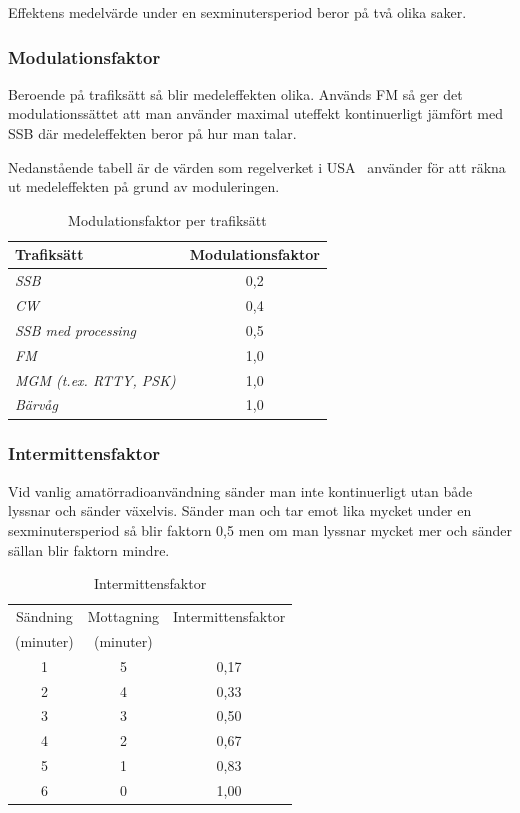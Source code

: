 Effektens medelvärde under en sexminutersperiod beror på två olika saker.

\subsubsection{Modulationsfaktor}

Beroende på trafiksätt så blir medeleffekten olika.
Används FM så ger det modulationssättet att man använder maximal uteffekt
kontinuerligt jämfört med SSB där medeleffekten beror på hur man talar.

Nedanstående tabell är de värden som regelverket i USA~\cite{OETbul65b} använder
för att räkna ut medeleffekten på grund av moduleringen.

\begin{table}[H]
  \begin{center}
    \begin{tabular}{lc}
	\textbf{Trafiksätt} & \textbf{Modulationsfaktor} \\ 
	\hline
	\emph{SSB} & 0,2 \\
	\emph{CW} & 0,4 \\
	\emph{SSB med processing} & 0,5 \\
	\emph{FM} & 1,0 \\
	\emph{MGM (t.ex. RTTY, PSK)} & 1,0 \\
	\emph{Bärvåg} & 1,0 \\
    \end{tabular}
    \caption{Modulationsfaktor per trafiksätt}
    \label{tab:modfakt}
  \end{center}
\end{table}

\subsubsection{Intermittensfaktor}

Vid vanlig amatörradioanvändning sänder man inte kontinuerligt utan både lyssnar
och sänder växelvis.
Sänder man och tar emot lika mycket under en sexminutersperiod så blir faktorn
0,5 men om man lyssnar mycket mer och sänder sällan blir faktorn mindre.

\begin{table}[H]
  \begin{center}
    \begin{tabular}{|c|c|c|}
	\hline
	Sändning  & Mottagning & Intermittensfaktor \\
	(minuter) & (minuter)  & \\ \hline
	1 & 5 & 0,17 \\ \hline
	2 & 4 & 0,33 \\ \hline
	3 & 3 & 0,50 \\ \hline
	4 & 2 & 0,67 \\ \hline
	5 & 1 & 0,83 \\ \hline
	6 & 0 & 1,00 \\ \hline
    \end{tabular}
    \caption{Intermittensfaktor}
    \label{tab:intfakt}
  \end{center}
\end{table}


